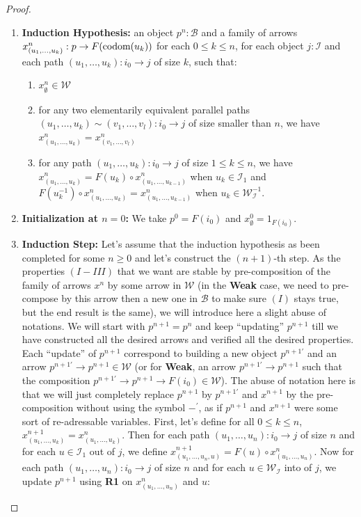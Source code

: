 \documentclass{article}
\numberwithin{equation}{section}
\theoremstyle{definition}
\theoremstyle{plain}
\begin{document}
\begin{proof}
\begin{enumerate}
		\begin{enumerate}[label = $\bullet$]
			\item \textbf{Induction Hypothesis:} an object $p^n: \mathcal{B}$ and a family of arrows $x^n_{(u_1, \dots, u_k)}: p \to F(\textnormal{codom}(u_k))$ for each $0 \le k \le n$, for each object $j:\mathcal{I}$ and each path $(u_1, \dots, u_k): i_0 \to j$ of size $k$, such that:
			\begin{enumerate}[label = $(\Roman*)$]
				\item $x^n_{\emptyset} \in \mathcal{W}$
				\item for any two elementarily equivalent parallel paths $(u_1, \dots, u_k) \sim (v_1, \dots, v_l): i_0 \to j$ of size smaller than $n$, we have $x^n_{(u_1, \dots, u_k)} = x^n_{(v_1, \dots, v_l)}$
				\item for any path $(u_1, \dots, u_k): i_0 \to j$ of size $1 \le k \le n$, we have $x^n_{(u_1, \dots, u_k)} = F(u_k) \circ x^n_{(u_1, \dots, u_{k-1})}$ when $u_k \in \mathcal{I}_1$ and $F(u_k^{-1}) \circ x^n_{(u_1, \dots, u_k)} = x^n_{(u_1, \dots, u_{k-1})}$ when $u_k \in \mathcal{W}_{\mathcal{I}}^{-1}$.
			\end{enumerate}
			\item \textbf{Initialization at $n=0$:} We take $p^0 = F(i_0)$ and $x^0_{\emptyset} = 1_{F(i_0)}$.
			\item \textbf{Induction Step:} Let's assume that the induction hypothesis as been completed for some $n\ge 0$ and let's construct the $(n+1)$-th step. As the properties $(I-III)$ that we want are stable by pre-composition of the family of arrows $x^n$ by some arrow in $\mathcal{W}$ (in the \textbf{Weak} case, we need to pre-compose by this arrow then a new one in $\mathcal{B}$ to make sure $(I)$ stays true, but the end result is the same), we will introduce here a slight abuse of notations. We will start with $p^{n+1} = p^n$ and keep ``updating'' $p^{n+1}$ till we have constructed all the desired arrows and verified all the desired properties. Each ``update'' of $p^{n+1}$ correspond to building a new object $p^{n+1\prime}$ and an arrow $p^{n+1\prime} \to p^{n+1} \in \mathcal{W}$ (or for \textbf{Weak}, an arrow $p^{n+1\prime} \to p^{n+1}$ such that the composition $p^{n+1\prime} \to p^{n+1} \to F(i_0) \in \mathcal{W}$). The abuse of notation here is that we will just completely replace $p^{n+1}$ by $p^{n+1\prime}$ and $x^{n+1}$ by the pre-composition without using the symbol $-^{\prime}$, as if $p^{n+1}$ and $x^{n+1}$ were some sort of re-adressable variables.
			First, let's define for all $0\le k \le n$, $x^{n+1}_{(u_1, \dots, u_k)} = x^n_{(u_1, \dots, u_k)}$. Then for each path $(u_1, \dots, u_n): i_0 \to j$ of size $n$ and for each $u \in \mathcal{I}_1$ out of $j$, we define $x^{n+1}_{(u_1, \dots, u_n, u)} = F(u) \circ x^{n}_{(u_1, \dots, u_n)}$. Now for each path $(u_1, \dots, u_n): i_0 \to j$ of size $n$ and for each $u \in \mathcal{W}_{\mathcal{I}}$ into of $j$, we update $p^{n+1}$ using \textbf{R1} on $x^{n}_{(u_1, \dots, u_n)}$ and $u$:

\end{enumerate}
\end{enumerate}
\end{proof}
\end{document}
